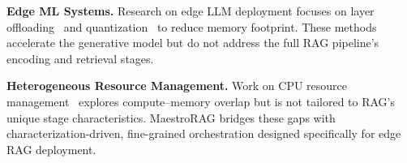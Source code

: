 \noindent\textbf{Edge ML Systems.}
Research on edge LLM deployment focuses on layer offloading~\cite{aminabadi2022deepspeedinferenceenablingefficient, sheng2023flexgenhighthroughputgenerativeinference} and quantization~\cite{quant, quant1} to reduce memory footprint. These methods accelerate the generative model but do not address the full RAG pipeline's encoding and retrieval stages.

\noindent\textbf{Heterogeneous Resource Management.}
Work on CPU resource management~\cite{gong2022graphite, nair2024parallelization} explores compute--memory overlap but is not tailored to RAG's unique stage characteristics. MaestroRAG bridges these gaps with characterization-driven, fine-grained orchestration designed specifically for edge RAG deployment.




